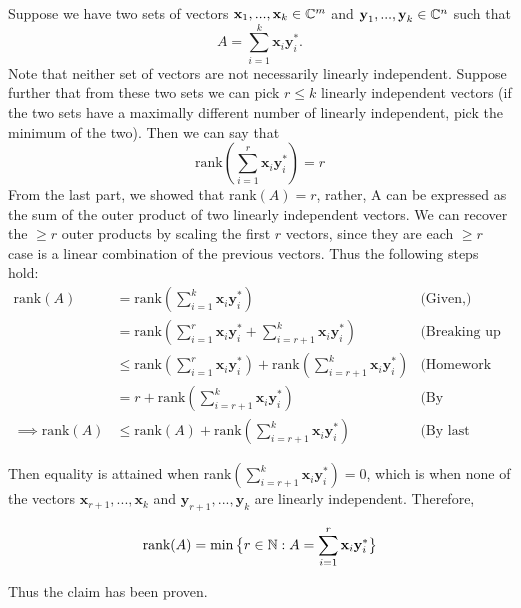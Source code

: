 \partbreak
\begin{solution}

    Suppose we have two sets of vectors $\textbf{x}_1, ..., \textbf{x}_k \in \mathbb{C}^m$ and $\textbf{y}_1, ..., \textbf{y}_k \in \mathbb{C}^n$ such that 
    \[
    A = \sum_{i = 1}^k\textbf{x}_i\textbf{y}_i^*.
    \]
    Note that neither set of vectors are not necessarily linearly independent. Suppose further that from these two sets we can pick $r \leq k$ linearly independent vectors (if the two sets have a maximally different number of linearly independent, pick the minimum of the two). Then we can say that 
    \[
    \text{rank}(\sum_{i = 1}^r \textbf{x}_i\textbf{y}_i^*) = r
    \]
    From the last part, we showed that rank$(A) = r$, rather, A can be expressed as the sum of the outer product of two linearly independent vectors. We can recover the $\geq r$ outer products by scaling the first $r$ vectors, since they are each $\geq r$ case is a linear combination of the previous vectors. Thus the following steps hold:
    \alignbreak
    \begin{align}
        \text{rank}(A) &= \text{rank}(\sum_{i = 1}^k \textbf{x}_i\textbf{y}_i^*) &\text{(Given,)}\nonumber\\
        &=\text{rank} (\sum_{i = 1}^r \textbf{x}_i\textbf{y}_i^* + \sum_{i = r+1}^k \textbf{x}_i\textbf{y}_i^*) &\text{(Breaking up summation.)}\nonumber\\
        &\leq \text{rank}(\sum_{i = 1}^r \textbf{x}_i\textbf{y}_i^*) + \text{rank}(\sum_{i = r+1}^k \textbf{x}_i\textbf{y}_i^*) &\text{(Homework 0, problem 1b.)}\nonumber\\
        &= r + \text{rank}(\sum_{i = r+1}^k \textbf{x}_i\textbf{y}_i^*) &\text{(By construction.)}\nonumber\\
        \implies \text{rank}(A) &\leq \text{rank}(A) + \text{rank}(\sum_{i = r+1}^k \textbf{x}_i\textbf{y}_i^*) &\text{(By last part.)}\nonumber
    \end{align}
    \alignbreak

    Then equality is attained when rank$(\sum_{i = r+1}^k \textbf{x}_i\textbf{y}_i^*) = 0$, which is when none of the vectors $\textbf{x}_{r+1}, ..., \textbf{x}_k$ and $\textbf{y}_{r+1}, ..., \textbf{y}_k$ are linearly independent. Therefore, 

    \[
    \text{rank}(A) = \min \big\{ r \in \mathbb{N} : A = \sum_{i = 1}^r \textbf{x}_i\textbf{y}_i^*\big\}
    \]

    Thus the claim has been proven.
\end{solution}

